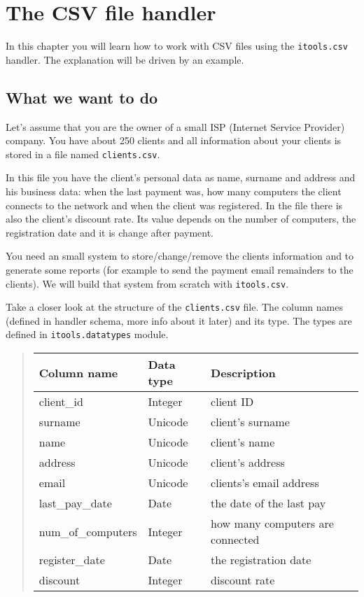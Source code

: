\documentclass[a4paper]{book}
\begin{document}
\chapter{The CSV file handler}

In this chapter you will learn how to work with CSV files using the
{\tt itools.csv} handler. The explanation will be driven by an example.


\section{What we want to do}

Let's assume that you are the owner of a small ISP (Internet Service
Provider) company. You have about 250 clients and all information
about your clients is stored in a file named {\tt clients.csv}.

In this file you have the client's personal data as name, surname
and address and his business data: when the last payment was, how many
computers the client connects to the network and when the client was
registered. In the file there is also the client's discount rate. 
Its value depends on the number of computers, the registration date
and it is change after payment.

You need an small system to store/change/remove the clients information
and to generate some reports (for example to send the payment email 
remainders to the clients). We will build that system from scratch
with {\tt itools.csv}.

Take a closer look at the structure of the {\tt clients.csv} file.
The column names (defined in handler schema, more info about it later)
and its type. The types are defined in {\tt itools.datatypes} module.

\begin{quote}
\begin{tabular}{|l|l|l|}
    \hline
    Column name & Data type & Description \\
    \hline
    client\_id & Integer & client ID \\
    surname & Unicode & client's surname \\
    name & Unicode & client's name \\
    address & Unicode & client's address \\
    email & Unicode & clients's email address \\
    last\_pay\_date & Date & the date of the last pay \\
    num\_of\_computers & Integer & how many computers are connected \\
    register\_date & Date & the registration date \\
    discount & Integer & discount rate \\
    \hline
\end{tabular}
\end{quote}
\end{document}
